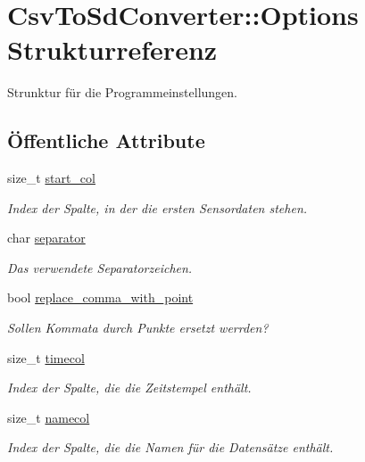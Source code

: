 \hypertarget{structCsvToSdConverter_1_1Options}{\section{Csv\-To\-Sd\-Converter\-:\-:Options Strukturreferenz}
\label{structCsvToSdConverter_1_1Options}
}


Strunktur für die Programmeinstellungen.  


\subsection*{Öffentliche Attribute}
\begin{DoxyCompactItemize}
\item 
size\-\_\-t \hyperlink{structCsvToSdConverter_1_1Options_a8d822728dd7c9b03261be6e994fd198c}{start\-\_\-col}
\begin{DoxyCompactList}\small\item\em Index der Spalte, in der die ersten Sensordaten stehen. \end{DoxyCompactList}\item 
char \hyperlink{structCsvToSdConverter_1_1Options_abdcf3a6497aac513eedad80fd85b2f76}{separator}
\begin{DoxyCompactList}\small\item\em Das verwendete Separatorzeichen. \end{DoxyCompactList}\item 
bool \hyperlink{structCsvToSdConverter_1_1Options_abadbda6c2d744b869b321eb05b3b1ca0}{replace\-\_\-comma\-\_\-with\-\_\-point}
\begin{DoxyCompactList}\small\item\em Sollen Kommata durch Punkte ersetzt werrden? \end{DoxyCompactList}\item 
size\-\_\-t \hyperlink{structCsvToSdConverter_1_1Options_a04caa5f640699fc38e1affe099c6d5eb}{timecol}
\begin{DoxyCompactList}\small\item\em Index der Spalte, die die Zeitstempel enthält. \end{DoxyCompactList}\item 
size\-\_\-t \hyperlink{structCsvToSdConverter_1_1Options_a49f5541b593cb8df87547d16a1738dc5}{namecol}
\begin{DoxyCompactList}\small\item\em Index der Spalte, die die Namen für die Datensätze enthält. \end{DoxyCompactList}\item 

\end{DoxyCompactItemize}
